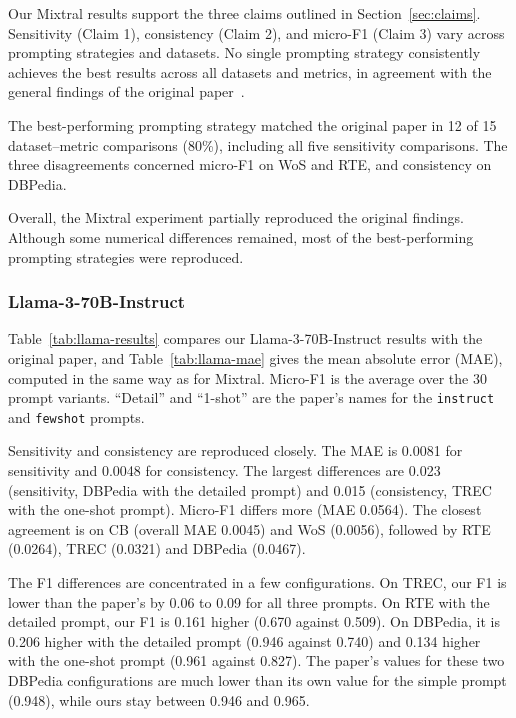 Our Mixtral results support the three claims
outlined in Section~\ref{sec:claims}.
Sensitivity (Claim 1), consistency (Claim 2),
and micro-F1 (Claim 3) vary across prompting
strategies and datasets. No single prompting
strategy consistently achieves the best results
across all datasets and metrics, in agreement
with the general findings of the original
paper~\cite{Errica:2025}.

\par\medskip

The best-performing prompting strategy matched
the original paper in 12 of 15 dataset--metric
comparisons (80\%), including all five
sensitivity comparisons. The three disagreements
concerned micro-F1 on WoS and RTE, and
consistency on DBPedia.

\par\medskip

Overall, the Mixtral experiment partially
reproduced the original findings. Although
some numerical differences remained, most
of the best-performing prompting strategies
were reproduced.


\subsubsection{Llama-3-70B-Instruct}

Table~\ref{tab:llama-results} compares our Llama-3-70B-Instruct results with the original paper, and Table~\ref{tab:llama-mae} gives the mean absolute error (MAE), computed in the same way as for Mixtral. Micro-F1 is the average over the 30 prompt variants. ``Detail'' and ``1-shot'' are the paper's names for the \texttt{instruct} and \texttt{fewshot} prompts.

Sensitivity and consistency are reproduced closely. The MAE is 0.0081 for
sensitivity and 0.0048 for consistency. The largest differences are 0.023
(sensitivity, DBPedia with the detailed prompt) and 0.015 (consistency, TREC with the one-shot prompt). Micro-F1 differs more (MAE 0.0564). The closest agreement is on CB (overall MAE 0.0045) and WoS (0.0056), followed by RTE (0.0264), TREC (0.0321) and DBPedia (0.0467).

The F1 differences are concentrated in a few configurations. On TREC, our F1 is lower than the paper's by 0.06 to 0.09 for all three prompts. On RTE with the detailed prompt, our F1 is 0.161 higher (0.670 against 0.509). On DBPedia, it is 0.206 higher with the detailed prompt (0.946 against 0.740) and 0.134 higher with the one-shot prompt (0.961 against 0.827). The paper's values for these two DBPedia configurations are much lower than its own value for the simple prompt (0.948), while ours stay between 0.946 and 0.965.

